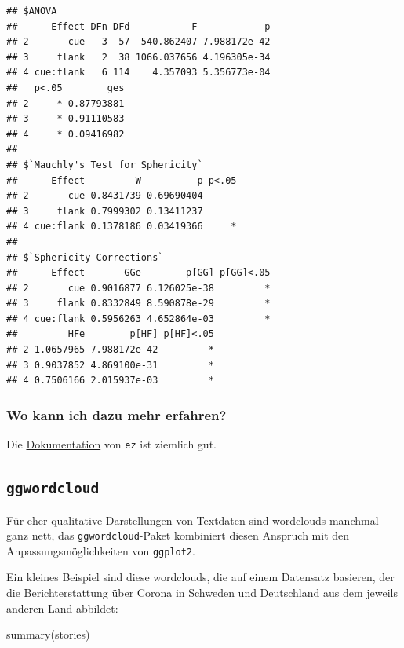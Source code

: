 \documentclass[
]{book}
\newenvironment{Shaded}{\begin{snugshade}}{\end{snugshade}}
\newcommand{\FunctionTok}[1]{\textcolor[rgb]{0.00,0.00,0.00}{#1}}
\newcommand{\NormalTok}[1]{#1}
\begin{document}
\begin{verbatim}
## $ANOVA
##      Effect DFn DFd           F            p
## 2       cue   3  57  540.862407 7.988172e-42
## 3     flank   2  38 1066.037656 4.196305e-34
## 4 cue:flank   6 114    4.357093 5.356773e-04
##   p<.05        ges
## 2     * 0.87793881
## 3     * 0.91110583
## 4     * 0.09416982
## 
## $`Mauchly's Test for Sphericity`
##      Effect         W          p p<.05
## 2       cue 0.8431739 0.69690404      
## 3     flank 0.7999302 0.13411237      
## 4 cue:flank 0.1378186 0.03419366     *
## 
## $`Sphericity Corrections`
##      Effect       GGe        p[GG] p[GG]<.05
## 2       cue 0.9016877 6.126025e-38         *
## 3     flank 0.8332849 8.590878e-29         *
## 4 cue:flank 0.5956263 4.652864e-03         *
##         HFe        p[HF] p[HF]<.05
## 2 1.0657965 7.988172e-42         *
## 3 0.9037852 4.869100e-31         *
## 4 0.7506166 2.015937e-03         *
\end{verbatim}

\hypertarget{wo-kann-ich-dazu-mehr-erfahren-1}{%
\subsubsection{Wo kann ich dazu mehr erfahren?}\label{wo-kann-ich-dazu-mehr-erfahren-1}}

Die \href{https://www.rdocumentation.org/packages/ez/versions/4.4-0}{Dokumentation} von \texttt{ez} ist ziemlich gut.

\hypertarget{ggwordcloud}{%
\subsection{\texorpdfstring{\texttt{ggwordcloud}}{ggwordcloud}}\label{ggwordcloud}}

Für eher qualitative Darstellungen von Textdaten sind wordclouds manchmal ganz nett, das \texttt{ggwordcloud}-Paket kombiniert diesen Anspruch mit den Anpassungsmöglichkeiten von \texttt{ggplot2}.

Ein kleines Beispiel sind diese wordclouds, die auf einem Datensatz basieren, der die Berichterstattung über Corona in Schweden und Deutschland aus dem jeweils anderen Land abbildet:

\begin{Shaded}
\begin{Highlighting}[]
\FunctionTok{summary}\NormalTok{(stories)}
\end{Highlighting}
\end{Shaded}
\end{document}
